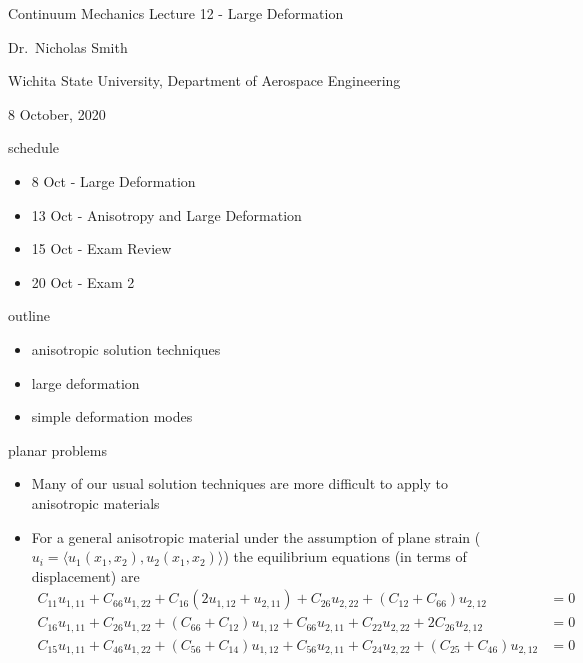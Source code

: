 \documentclass[
  letterpaper,
  ignorenonframetext,
  aspectratio=43,
  handout,
  12pt]{beamer}
\author{}
\date{}
\providecommand{\tightlist}{%
  \setlength{\itemsep}{0pt}\setlength{\parskip}{0pt}}
\providecommand{\tightlist}{%
\setlength{\itemsep}{0pt}\setlength{\parskip}{0pt}}
\begin{document}
\begin{frame}{Continuum Mechanics}
\protect\hypertarget{continuum-mechanics}{}
Lecture 12 - Large Deformation

Dr.~Nicholas Smith

Wichita State University, Department of Aerospace Engineering

8 October, 2020
\end{frame}

\begin{frame}{schedule}
\protect\hypertarget{schedule}{}
\begin{itemize}
\tightlist
\item
  8 Oct - Large Deformation
\item
  13 Oct - Anisotropy and Large Deformation
\item
  15 Oct - Exam Review
\item
  20 Oct - Exam 2
\end{itemize}
\end{frame}

\begin{frame}{outline}
\protect\hypertarget{outline}{}
\begin{itemize}
\tightlist
\item
  anisotropic solution techniques
\item
  large deformation
\item
  simple deformation modes
\end{itemize}
\end{frame}

\begin{frame}{planar problems}
\protect\hypertarget{planar-problems}{}
\begin{itemize}
\tightlist
\item
  Many of our usual solution techniques are more difficult to apply to
  anisotropic materials
\item
  For a general anisotropic material under the assumption of plane
  strain (\(u_i = \langle u_1(x_1,x_2), u_2(x_1,x_2)\rangle\)) the
  equilibrium equations (in terms of displacement) are \[\begin{aligned}
    C_{11} u_{1,11} + C_{66} u_{1,22} + C_{16} (2u_{1,12} + u_{2,11}) + C_{26} u_{2,22} + (C_{12}+C_{66})u_{2,12} &=0\\
    C_{16} u_{1,11} + C_{26} u_{1,22} + (C_{66} + C_{12}) u_{1,12} + C_{66} u_{2,11} + C_{22}u_{2,22} + 2C_{26}u_{2,12} &=0\\
    C_{15} u_{1,11} + C_{46} u_{1,22} + (C_{56} + C_{14})u_{1,12} + C_{56}u_{2,11} + C_{24} u_{2,22} + (C_{25}+C_{46})u_{2,12} &=0
  \end{aligned}\]
\end{itemize}
\end{frame}
\end{document}
